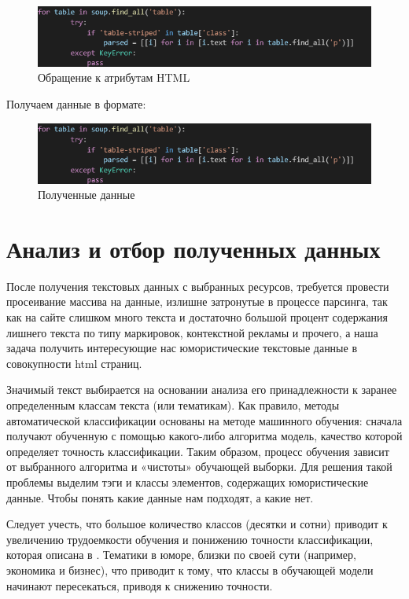 \begin{figure}[H]
\includegraphics[width=0.75\columnwidth]{./img/code_block_6.png}
\centering
\caption{Обращение к атрибутам HTML}
\label{pic:code_block_6.png}
\end{figure}

Получаем данные в формате:

\begin{figure}[H]
\includegraphics[width=0.75\columnwidth]{./img/code_block_6.png}
\centering
\caption{Полученные данные}
\label{pic:code_js.png}
\end{figure}


\section{Анализ и отбор полученных данных}

После получения текстовых данных с выбранных ресурсов, требуется провести просеивание массива на данные, 
излишне затронутые в процессе парсинга, так как на сайте слишком много текста и достаточно большой процент 
содержания лишнего текста по типу маркировок, контекстной рекламы и прочего, а наша задача получить интересующие 
нас юмористические текстовые данные в совокупности html страниц.

Значимый текст выбирается на основании анализа его принадлежности к заранее определенным классам текста (или тематикам). 
Как правило, методы автоматической классификации основаны на методе машинного обучения: сначала получают обученную с 
помощью какого-либо алгоритма модель, качество которой определяет точность классификации. Таким образом, процесс 
обучения зависит от выбранного алгоритма и «чистоты» обучающей выборки. Для решения такой проблемы выделим тэги и 
классы элементов, содержащих юмористические данные. Чтобы понять какие данные нам подходят, а какие нет. 

Следует учесть, что большое количество классов (десятки и сотни) приводит к увеличению трудоемкости обучения и 
понижению точности классификации, которая описана в \cite{neural06}. Тематики в юморе, близки по своей сути (например, экономика и бизнес), что 
приводит к тому, что классы в обучающей модели начинают пересекаться, приводя к снижению точности. 

